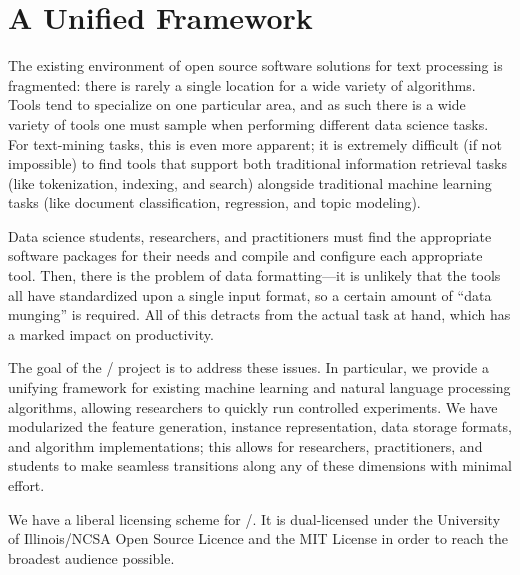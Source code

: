 \section{A Unified Framework}
\label{sec:framework}

The existing environment of open source software solutions for text processing
is fragmented: there is rarely a single location for a wide variety of
algorithms. Tools tend to specialize on one particular area, and as such there
is a wide variety of tools one must sample when performing different data
science tasks. For text-mining tasks, this is even more apparent; it is
extremely difficult (if not impossible) to find tools that support both
traditional information retrieval tasks (like tokenization, indexing, and
search) alongside traditional machine learning tasks (like document
classification, regression, and topic modeling).

Data science students, researchers, and practitioners must find the appropriate
software packages for their needs and compile and configure each appropriate
tool. Then, there is the problem of data formatting---it is unlikely that the
tools all have standardized upon a single input format, so a certain amount of
``data munging'' is required. All of this detracts from the actual task at hand,
which has a marked impact on productivity.

The goal of the \meta/ project is to address these issues. In particular, we
provide a unifying framework for existing machine learning and natural language
processing algorithms, allowing researchers to quickly run controlled
experiments. We have modularized the feature generation, instance
representation, data storage formats, and algorithm implementations; this allows
for researchers, practitioners, and students to make seamless transitions along
any of these dimensions with minimal effort.

We have a liberal licensing scheme for \meta/. It is dual-licensed under the
University of Illinois/NCSA Open Source Licence and the MIT License in order to
reach the broadest audience possible.

